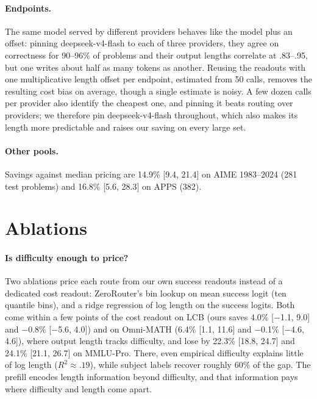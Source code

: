 \documentclass[10pt,twocolumn,letterpaper]{article}
\begin{document}
\paragraph{Endpoints.}
The same model served by different providers behaves like the model plus an offset: pinning deepseek-v4-flash to each of three providers, they agree on correctness for 90--96\% of problems and their output lengths correlate at .83--.95, but one writes about half as many tokens as another. Reusing the readouts with one multiplicative length offset per endpoint, estimated from 50 calls, removes the resulting cost bias on average, though a single estimate is noisy. A few dozen calls per provider also identify the cheapest one, and pinning it beats routing over providers; we therefore pin deepseek-v4-flash throughout, which also makes its length more predictable and raises our saving on every large set.

\paragraph{Other pools.}
Savings against median pricing are 14.9\% [9.4, 21.4] on AIME 1983--2024 (281 test problems) and 16.8\% [5.6, 28.3] on APPS (382).

\section{Ablations}
\paragraph{Is difficulty enough to price?}
Two ablations price each route from our own success readouts instead of a dedicated cost readout: ZeroRouter's bin lookup on mean success logit (ten quantile bins), and a ridge regression of log length on the success logits. Both come within a few points of the cost readout on LCB (ours saves 4.0\% [$-$1.1, 9.0] and $-$0.8\% [$-$5.6, 4.0]) and on Omni-MATH (6.4\% [1.1, 11.6] and $-$0.1\% [$-$4.6, 4.6]), where output length tracks difficulty, and lose by 22.3\% [18.8, 24.7] and 24.1\% [21.1, 26.7] on MMLU-Pro. There, even empirical difficulty explains little of log length ($R^2\approx .19$), while subject labels recover roughly 60\% of the gap. The prefill encodes length information beyond difficulty, and that information pays where difficulty and length come apart.
\end{document}
